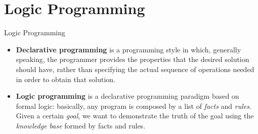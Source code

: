 \author[Vetere F.] {
\large{\textsc{Author}: Francesco Vetere\\ \small \textsc{e-mail:} \href{mailto:francesco.vetere@studenti.unipr.it}{francesco.vetere@studenti.unipr.it} }
}




\date {\textsc{A.Y. 2019/2020}}


\usepackage{algorithm}
\usepackage{algpseudocode}
\renewcommand{\algorithmicrequire}{\textbf{Input:}}
\renewcommand{\algorithmicensure}{\textbf{Output:}}



\begin{frame}
\maketitle
\end{frame}


\section{Logic Programming}
\begin{frame}{Logic Programming}
\begin{itemize}
\item \textbf{Declarative programming} is a programming style in which, generally speaking, the
programmer provides the properties that the desired solution should have, rather than specifying the actual sequence of operations needed in order to obtain that solution.
\item \textbf{Logic programming} is a declarative programming paradigm based on formal logic: basically, any program is composed by a list of \emph{facts} and \emph{rules}.\\
Given a certain \textit{goal}, we want to demonstrate the truth of the goal using the \emph{knowledge base} formed by facts and rules.
\end{itemize}
\end{frame}

